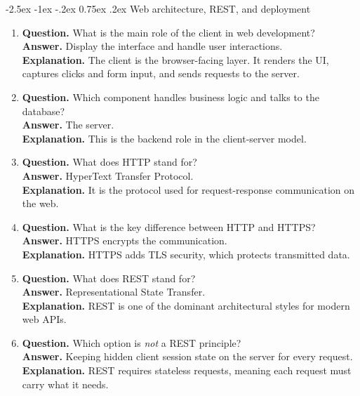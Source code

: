 \documentclass[11pt,a4paper]{article}
\makeatletter
\renewcommand\subsection{\@startsection{subsection}{2}{\z@}%
  {-2.5ex \@plus -1ex \@minus -.2ex}%
  {0.75ex \@plus .2ex}%
  {\normalfont\large\sffamily\bfseries\color{MidnightBlue}}}
\makeatother
\begin{document}
\subsection{Web architecture, REST, and deployment}

\begin{enumerate}
  \item \textbf{Question.} What is the main role of the client in web development?\\
  \textbf{Answer.} Display the interface and handle user interactions.\\
  \textbf{Explanation.} The client is the browser-facing layer. It renders the UI, captures clicks and form input, and sends requests to the server.

  \item \textbf{Question.} Which component handles business logic and talks to the database?\\
  \textbf{Answer.} The server.\\
  \textbf{Explanation.} This is the backend role in the client-server model.

  \item \textbf{Question.} What does HTTP stand for?\\
  \textbf{Answer.} HyperText Transfer Protocol.\\
  \textbf{Explanation.} It is the protocol used for request-response communication on the web.

  \item \textbf{Question.} What is the key difference between HTTP and HTTPS?\\
  \textbf{Answer.} HTTPS encrypts the communication.\\
  \textbf{Explanation.} HTTPS adds TLS security, which protects transmitted data.

  \item \textbf{Question.} What does REST stand for?\\
  \textbf{Answer.} Representational State Transfer.\\
  \textbf{Explanation.} REST is one of the dominant architectural styles for modern web APIs.

  \item \textbf{Question.} Which option is \emph{not} a REST principle?\\
  \textbf{Answer.} Keeping hidden client session state on the server for every request.\\
  \textbf{Explanation.} REST requires stateless requests, meaning each request must carry what it needs.


\end{enumerate}
\end{document}
